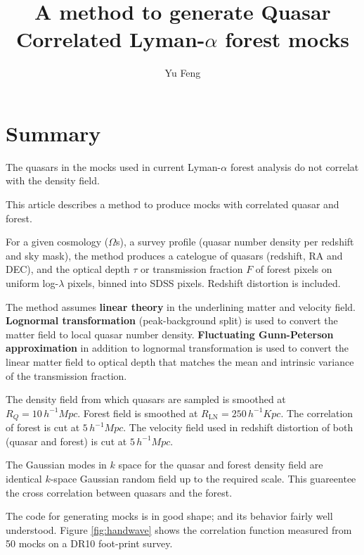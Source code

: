 \documentclass{paper}
\begin{document}
\newcommand{\diff}{\,\mathrm{d}}
\newcommand{\mpch}{\,\unit{h^{-1}Mpc}}
\newcommand{\kpch}{\,\unit{h^{-1}Kpc}}
\title{A method to generate Quasar Correlated Lyman-$\alpha$
    forest mocks}
\author{Yu Feng}
\maketitle

\section{Summary}
    The quasars in the mocks used in current Lyman-$\alpha$ forest analysis 
    do not correlat with the density field. 

    This article describes a method to produce mocks with correlated quasar and forest.

    For a given cosmology ($\Omega$s), a survey
    profile (quasar number density per redshift and sky
    mask), the method produces a catelogue of quasars (redshift, RA
    and DEC), and the optical depth $\tau$ or transmission fraction $F$ of 
    forest pixels on uniform log-$\lambda$ pixels, binned into SDSS
    pixels. Redshift distortion is included. 
    
    The method assumes \textbf{linear theory} in the underlining
    matter and velocity field. \textbf{Lognormal transformation} (peak-background
    split) is used to convert the matter field to local quasar
    number density. \textbf{Fluctuating Gunn-Peterson
    approximation} in addition to lognormal transformation is used to
    convert the linear matter field to optical depth that
    matches the mean and intrinsic variance of the
    transmission fraction.
    
    The density field from which quasars are sampled is 
    smoothed at $R_Q = 10\mpch$.
    Forest field is smoothed at $R_\mathrm{LN} = 250\kpch$. The correlation
    of forest is cut at $5\mpch$. The velocity field used in
    redshift distortion of both (quasar and forest) is
    cut at $5\mpch$.

    The Gaussian modes in $k$ space for the quasar and forest
    density field are identical $k$-space Gaussian random field
    up to the required scale.  This guareentee the cross
    correlation between quasars and the forest.

    The code for generating mocks is in good shape; and its behavior
    fairly well understood.
    Figure \ref{fig:handwave} shows the correlation function measured
    from 50 mocks on a DR10 foot-print survey.
\end{document}
